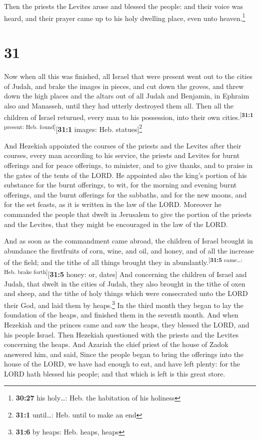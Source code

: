  Then the priests the Levites arose and blessed the
people: and their voice was heard, and their prayer came up to his holy
dwelling place, even unto heaven.\footnote{\textbf{30:27} his
  holy\ldots: Heb. the habitation of his holiness}

\hypertarget{section-30}{%
\section{31}\label{section-30}}

 Now when all this was finished, all Israel that were
present went out to the cities of Judah, and brake the images in pieces,
and cut down the groves, and threw down the high places and the altars
out of all Judah and Benjamin, in Ephraim also and Manasseh, until they
had utterly destroyed them all. Then all the children of Israel
returned, every man to his possession, into their own
cities.\textsuperscript{{[}\textbf{31:1} present: Heb.
found{]}}{[}\textbf{31:1} images: Heb. statues{]}\footnote{\textbf{31:1}
  until\ldots: Heb. until to make an end}

 And Hezekiah appointed the courses of the priests and the
Levites after their courses, every man according to his service, the
priests and Levites for burnt offerings and for peace offerings, to
minister, and to give thanks, and to praise in the gates of the tents of
the LORD.  He appointed also the king's portion of his
substance for the burnt offerings, to wit, for the morning and evening
burnt offerings, and the burnt offerings for the sabbaths, and for the
new moons, and for the set feasts, as it is written in the law of the
LORD.  Moreover he commanded the people that dwelt in
Jerusalem to give the portion of the priests and the Levites, that they
might be encouraged in the law of the LORD.

 And as soon as the commandment came abroad, the children
of Israel brought in abundance the firstfruits of corn, wine, and oil,
and honey, and of all the increase of the field; and the tithe of all
things brought they in abundantly.\textsuperscript{{[}\textbf{31:5}
came\ldots: Heb. brake forth{]}}{[}\textbf{31:5} honey: or, dates{]}
 And concerning the children of Israel and Judah, that
dwelt in the cities of Judah, they also brought in the tithe of oxen and
sheep, and the tithe of holy things which were consecrated unto the LORD
their God, and laid them by heaps.\footnote{\textbf{31:6} by heaps: Heb.
  heaps, heaps}  In the third month they began to lay the
foundation of the heaps, and finished them in the seventh month.
 And when Hezekiah and the princes came and saw the heaps,
they blessed the LORD, and his people Israel.  Then
Hezekiah questioned with the priests and the Levites concerning the
heaps.  And Azariah the chief priest of the house of
Zadok answered him, and said, Since the people began to bring the
offerings into the house of the LORD, we have had enough to eat, and
have left plenty: for the LORD hath blessed his people; and that which
is left is this great store.

